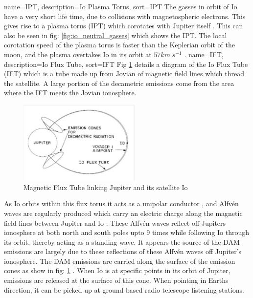 \documentclass[runningheads,a4paper]{llncs}
\begin{document}
%
{
  name={IPT},
  description={Io Plasma Torus},
  sort=IPT
}
%
The gasses in orbit of Io have a very short life time, due to collisions with magnetospheric electrons. This gives rise to a plasma torus (\gls{IPT}) which corotates with Jupiter itself \citep{belcher87}. This can also be seen in fig: \ref{fig:io_neutral_gasses} which shows the \gls{IPT}. The local corotation speed of the plasma torus is faster than the Keplerian orbit of the moon, and the plasma overtakes Io in its orbit at \begin{math} 57 km\;s^{-1} \end{math} \citep{belcher87}.
%
{
  name={IFT},
  description={Io Flux Tube},
  sort=IFT
}
%
Fig \ref{fig:io_flux_tube} details a diagram of the Io Flux Tube (\gls{IFT}) which is a tube made up from Jovian of magnetic field lines \citep{belcher87} which thread the satellite. A large portion of the decametric emissions come from the area where the \gls{IFT} meets the Jovian ionosphere. 
%
\begin{figure}[here]
\centering
\includegraphics[width=6cm]{images/03}
\caption{Magnetic Flux Tube linking Jupiter and its satellite Io \citep{belcher87}}
\label{fig:io_flux_tube}
\end{figure}
%
As Io orbits within this flux torus it acts as a unipolar conductor \citep{bose08}, and Alfv\'en waves are regularly produced which carry an electric charge along the magnetic field lines between Jupiter and Io \citep{bose08}. These Alfv\'en waves reflect off Jupiters ionosphere at both north and south poles upto 9 times \citep{bose08} while following Io through its orbit, thereby acting as a standing wave. It appears the source of the \gls{DAM} emissions are largely due to these reflections of these Alfv\'en waves off Jupiter's ionosphere.
%
The \gls{DAM} emissions are carried along the surface of the emission cones as show in fig: \ref{fig:io_flux_tube} \citep{belcher87}. When Io is at specific points in its orbit of Jupiter, emissions are released at the surface of this cone. When pointing in Earths direction, it can be picked up at ground based radio telescope listening stations.
%
%
\newpage
\end{document}
